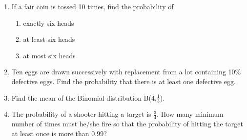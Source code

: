 \begin{enumerate}[label=\arabic*.,ref=\thesubsection.\theenumi]
\item If a fair coin is tossed 10 times, find the probability of
\begin{enumerate}
\item  exactly six heads
\item  at least six heads
\item  at most six  heads
\end{enumerate}
\solution


\item Ten eggs are drawn successively with replacement from a lot containing 10$\%$ defective eggs. Find the probability that there is at least one defective egg.\\
\solution


\item Find the mean of the Binomial distribution B(4,$\frac{1}{3}$).
\\
\solution


\item The probability of a shooter hitting a target is $\frac{3}{4}$. How many minimum
number of times must he/she fire so that the probability of hitting the target at least
once is more than 0.99?
\\
\solution



\end{enumerate}
